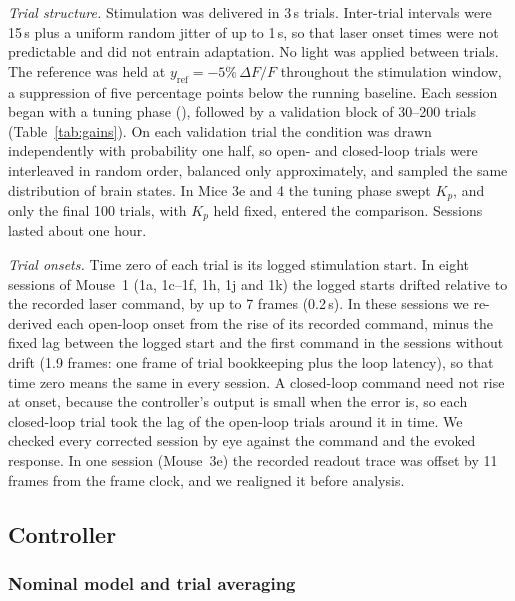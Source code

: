 \emph{Trial structure.} Stimulation was delivered in 3\,s trials.
Inter-trial intervals were 15\,s plus a uniform random jitter of up to 1\,s, so that laser onset times were not predictable and did not entrain adaptation.
No light was applied between trials.
The reference was held at $y_{\mathrm{ref}} = -5\%\,\Delta F/F$ throughout the stimulation window, a suppression of five percentage points below the running baseline.
Each session began with a tuning phase (), followed by a validation block of 30--200 trials (Table~\ref{tab:gains}).
On each validation trial the condition was drawn independently with probability one half, so open- and closed-loop trials were interleaved in random order, balanced only approximately, and sampled the same distribution of brain states.
In Mice 3e and 4 the tuning phase swept $K_p$, and only the final 100 trials, with $K_p$ held fixed, entered the comparison.
Sessions lasted about one hour.

\emph{Trial onsets.} Time zero of each trial is its logged stimulation start.
In eight sessions of Mouse~1 (1a, 1c--1f, 1h, 1j and 1k) the logged starts drifted relative to the recorded laser command, by up to 7 frames (0.2\,s).
In these sessions we re-derived each open-loop onset from the rise of its recorded command, minus the fixed lag between the logged start and the first command in the sessions without drift (1.9 frames: one frame of trial bookkeeping plus the loop latency), so that time zero means the same in every session.
A closed-loop command need not rise at onset, because the controller's output is small when the error is, so each closed-loop trial took the lag of the open-loop trials around it in time.
We checked every corrected session by eye against the command and the evoked response.
In one session (Mouse~3e) the recorded readout trace was offset by 11 frames from the frame clock, and we realigned it before analysis.

\subsection*{Controller}

\subsubsection*{Nominal model and trial averaging}

